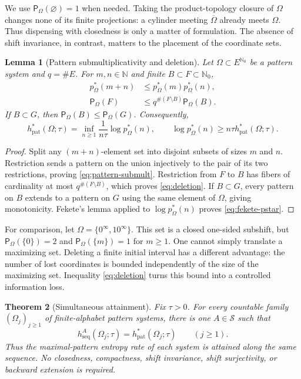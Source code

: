 \documentclass[11pt,reqno]{amsart}
\numberwithin{equation}{section}
\newtheorem{theorem}{Theorem}[section]
\newtheorem{lemma}[theorem]{Lemma}
\theoremstyle{definition}
\newcommand{\N}{\mathbb N}
\newcommand{\Nzero}{\mathbb N_0}
\newcommand{\Patt}{\mathsf P}
\newcommand{\hseq}{h_{\mathrm{seq}}}
\newcommand{\hpat}{h_{\mathrm{pat}}^{*}}
\begin{document}
We use $\Patt_\Omega(\varnothing)=1$ when needed.
Taking the product-topology closure of $\Omega$ changes none of its
finite projections: a cylinder meeting $\overline\Omega$ already meets
$\Omega$. Thus dispensing with closedness is only a matter of
formulation. The absence of shift invariance, in contrast, matters to the
placement of the coordinate sets.

\begin{lemma}[Pattern submultiplicativity and deletion]\label{lem:pattern-submult}
Let $\Omega\subset E^{\Nzero}$ be a pattern system and $q=\#E$.
For $m,n\in\N$ and finite $B\subset F\subset\Nzero$,
\begin{align}
 p_\Omega^*(m+n)&\le p_\Omega^*(m)p_\Omega^*(n),
 \label{eq:pattern-submult}\\
 \Patt_\Omega(F)&\le q^{\#(F\setminus B)}\Patt_\Omega(B).
 \label{eq:deletion} 
\end{align}
If $B\subset G$, then $\Patt_\Omega(B)\le\Patt_\Omega(G)$.
Consequently,
\begin{equation}\label{eq:fekete-pstar}
 \hpat(\Omega;\tau)
 =\inf_{n\ge1}\frac1{n\tau}\log p_\Omega^*(n),
 \qquad
 \log p_\Omega^*(n)\ge n\tau\hpat(\Omega;\tau).
\end{equation}
\end{lemma}

\begin{proof}
Split any $(m+n)$-element set into disjoint subsets of sizes $m$ and $n$.
Restriction sends a pattern on the union injectively to the pair of its two
restrictions, proving \eqref{eq:pattern-submult}.  Restriction from $F$ to
$B$ has fibers of cardinality at most $q^{\#(F\setminus B)}$, which proves
\eqref{eq:deletion}.  If $B\subset G$, every pattern on $B$ extends to a
pattern on $G$ using the same element of $\Omega$, giving monotonicity.
Fekete's lemma applied to $\log p_\Omega^*(n)$ proves
\eqref{eq:fekete-pstar}.
\end{proof}

For comparison, let $\Omega=\{0^\infty,10^\infty\}$. This set is a
closed one-sided subshift, but
$\Patt_\Omega(\{0\})=2$ and $\Patt_\Omega(\{m\})=1$ for $m\ge1$.
One cannot simply translate a maximizing set. Deleting a finite initial
interval has a different advantage: the number of lost coordinates is
bounded independently of the size of the maximizing set. Inequality
\eqref{eq:deletion} turns this bound into a controlled information loss.

\begin{theorem}[Simultaneous attainment]\label{thm:A}
Fix $\tau>0$.  For every countable family
$(\Omega_j)_{j\ge1}$ of finite-alphabet pattern systems, there is one
$A\in\mathscr S$ such that
\begin{equation}\label{eq:simultaneous-attainment}
 \hseq^A(\Omega_j;\tau)=\hpat(\Omega_j;\tau)
 \qquad(j\ge1).
\end{equation}
Thus the maximal-pattern entropy rate of each system is attained along the same
sequence.  No closedness, compactness, shift invariance, shift surjectivity, or
backward extension is required.
\end{theorem}
\end{document}
